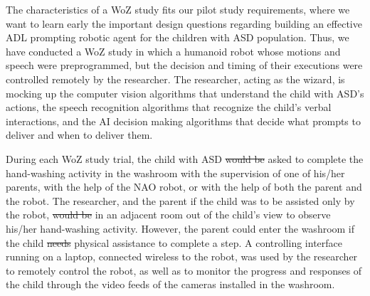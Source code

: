 \documentclass{ut-thesis}
\providecommand{\DIFaddtex}[1]{{\protect\color{blue}\uwave{#1}}} %
\providecommand{\DIFdeltex}[1]{{\protect\color{red}\sout{#1}}}                      %
\providecommand{\DIFaddbegin}{} %
\providecommand{\DIFaddend}{} %
\providecommand{\DIFdelbegin}{} %
\providecommand{\DIFdelend}{} %
\providecommand{\DIFadd}[1]{\texorpdfstring{\DIFaddtex{#1}}{#1}} %
\providecommand{\DIFdel}[1]{\texorpdfstring{\DIFdeltex{#1}}{}} %
\begin{document}
The characteristics of a WoZ study fits our pilot study requirements, where we want to learn early the important design questions regarding building an effective ADL prompting robotic agent for the children with ASD population.  Thus, we have conducted a WoZ study in which a humanoid robot whose motions and speech were preprogrammed, but the decision and timing of their executions were controlled remotely by the researcher.  The researcher, acting as the wizard, is mocking up the computer vision algorithms that understand the child with ASD's actions, the speech recognition algorithms that recognize the child's verbal interactions, and the AI decision making algorithms that decide what prompts to deliver and when to deliver them.

During each WoZ study trial, the child with ASD \DIFdelbegin \DIFdel{would be }\DIFdelend \DIFaddbegin \DIFadd{was }\DIFaddend asked to complete the hand-washing activity in the washroom with the supervision of one of his/her parents, with the help of the NAO robot, or with the help of both the parent and the robot. The researcher, and the parent if the child was to be assisted only by the robot, \DIFdelbegin \DIFdel{would be }\DIFdelend \DIFaddbegin \DIFadd{were }\DIFaddend in an adjacent room out of the child's view to observe his/her hand-washing activity.  However, the parent could enter the washroom if the child \DIFdelbegin \DIFdel{needs }\DIFdelend \DIFaddbegin \DIFadd{needed }\DIFaddend physical assistance to complete a step. A controlling interface running on a laptop, connected wireless to the robot, was used by the researcher to remotely control the robot, as well as to monitor the progress and responses of the child through the video feeds of the cameras installed in the washroom.
\end{document}
